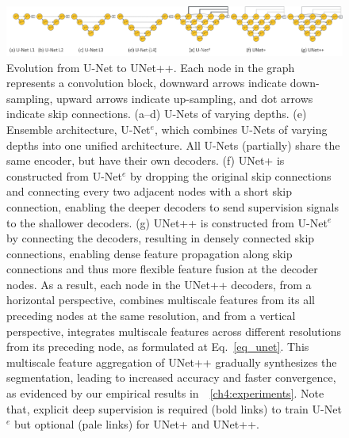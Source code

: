 \begin{figure}
\begin{center}
\includegraphics[width=1.0\columnwidth]{Figures/CH4/fig_architecture_evolution.pdf}
\end{center}
\caption[Evolution from U-Net to UNet++]{
Evolution from U-Net to UNet++. Each node in the graph represents a convolution block, downward arrows indicate down-sampling, upward arrows indicate up-sampling, and dot arrows indicate skip connections. (a--d) U-Nets of varying depths. (e) Ensemble architecture, U-Net$^e$, which combines U-Nets of varying depths into one unified architecture. All U-Nets (partially) share the same encoder, but have their own decoders.
(f) UNet+ is constructed from U-Net$^e$ by dropping the original skip connections and connecting every two adjacent nodes with a short skip connection, enabling the deeper decoders to send supervision signals to the shallower decoders. (g) UNet++ is constructed from U-Net$^e$ by connecting the decoders, resulting in densely connected skip connections, enabling dense feature propagation along skip connections and thus more flexible feature fusion at the decoder nodes.
As a result, each node in the UNet++ decoders, from a horizontal perspective, combines multiscale features from its all preceding nodes at the same resolution, and from a vertical perspective, integrates multiscale features across different resolutions from its preceding node, as formulated at Eq.~\ref{eq_unet}. This multiscale feature aggregation of UNet++ gradually synthesizes the segmentation, leading to increased accuracy and faster convergence, as evidenced by our empirical results in~\sectionname~\ref{ch4:experiments}.
Note that, explicit deep supervision is required (bold links) to train U-Net$^e$ but optional (pale links) for UNet+ and UNet++.}
\label{ch4:fig:network_architecture}
\end{figure}



